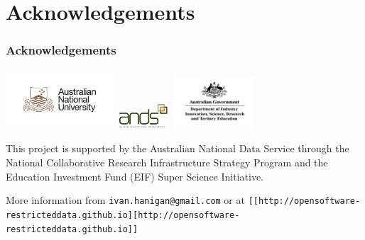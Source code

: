 \documentclass[bigger]{beamer}
\begin{document}
\section{Acknowledgements}
\label{sec-5}
\begin{frame}
\frametitle{Acknowledgements}
\label{sec-5-1}

\includegraphics[width=4cm]{ANU_LOGO_cmyk_56mm.png}
\includegraphics[width=2cm]{andslogo.pdf}
\includegraphics[width=3cm]{deptlogo.pdf} \\
\begin{footnotesize}
This project is supported by the Australian National Data Service through the National Collaborative Research Infrastructure Strategy Program and the Education Investment Fund (EIF) Super Science Initiative.

More information from \texttt{ivan.hanigan@gmail.com} or at \texttt{[[http://opensoftware-restricteddata.github.io][http://opensoftware-restricteddata.github.io]]}

\end{footnotesize}
\end{frame}
\end{document}
